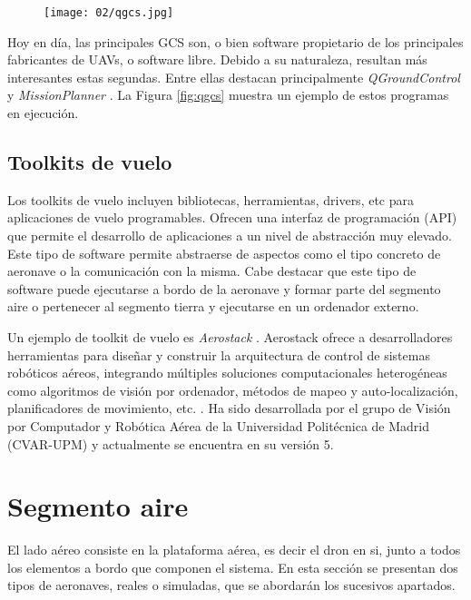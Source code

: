 \documentclass[../main.tex]{subfiles}
\begin{document}
\begin{figure}[ht]
 	{\texttt{[image: 02/qgcs.jpg]}}
\end{figure}

Hoy en día, las principales GCS son, o bien software propietario de los principales fabricantes de UAVs, o software libre. Debido a su naturaleza, resultan más interesantes estas segundas. Entre ellas destacan principalmente \emph{QGroundControl} \cite{qgcs} y \emph{MissionPlanner} \cite{mission-planner}. La Figura \ref{fig:qgcs} muestra un ejemplo de estos programas en ejecución.

\subsection{Toolkits de vuelo} \label{section:herram-toolkits}
Los toolkits de vuelo incluyen bibliotecas, herramientas, drivers, etc para aplicaciones de vuelo programables. Ofrecen una interfaz de programación (API) que permite el desarrollo de aplicaciones a un nivel de abstracción muy elevado. Este tipo de software permite abstraerse de aspectos como el tipo concreto de aeronave o la comunicación con la misma. Cabe destacar que este tipo de software puede ejecutarse a bordo de la aeronave y formar parte del segmento aire o pertenecer al segmento tierra y ejecutarse en un ordenador externo. 

Un ejemplo de toolkit de vuelo es \emph{Aerostack} \cite{aerostack-github}. Aerostack ofrece a desarrolladores herramientas para diseñar y construir la arquitectura de control de sistemas robóticos aéreos, integrando múltiples soluciones computacionales heterogéneas como algoritmos de visión por ordenador, métodos de mapeo y auto-localización, planificadores de movimiento, etc. \cite{sanchez2016aerostack}. Ha sido desarrollada por el grupo de Visión por Computador y Robótica Aérea de la Universidad Politécnica de Madrid (CVAR-UPM) \cite{cvar} y actualmente se encuentra en su versión 5.

\section{Segmento aire} \label{section:herram-aire}
El lado aéreo consiste en la plataforma aérea, es decir el dron en si, junto a todos los elementos a bordo que componen el sistema. En esta sección se presentan dos tipos de aeronaves, reales o simuladas, que se abordarán los sucesivos apartados.
\end{document}
